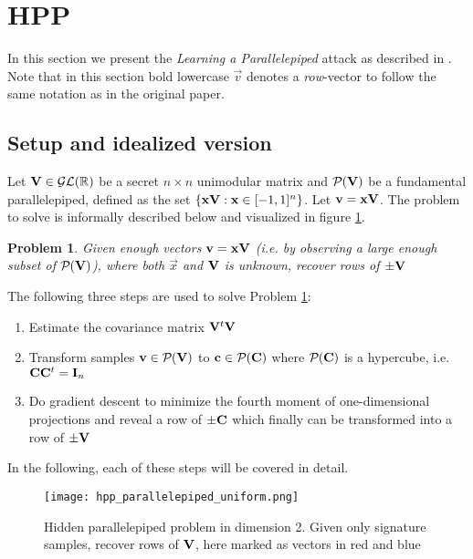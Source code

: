\newtheorem{lemma}{Lemma}
\newtheorem{proof}{Proof}
\newtheorem{hpp_problem_basic}{Problem}

\section{HPP}
In this section we present the \textit{Learning a Parallelepiped} attack as described in \cite{NR09}. 
Note that in this section bold lowercase $\vec{v}$ denotes a \textit{row}-vector to follow the same notation as in the original paper.
\subsection{Setup and idealized version}
Let $\mathbf{V} \in \mathcal{GL}(\mathbb{R})$ be a secret $n \times n$ unimodular matrix and $\mathcal{P}_{}(\mathbf{V})$ be a fundamental parallelepiped, defined as the set $\{\mathbf{x}\mathbf{V}: \mathbf{x} \in [-1, 1]^n\}$. 
Let $\mathbf{v} = \mathbf{x} \mathbf{V}$. 
The problem to solve is informally described below and visualized in figure \ref{hpp_parallelepiped_uniform}.

\begin{hpp_problem_basic}\label{Basic HPP problem}
    Given enough vectors $\mathbf{v} = \mathbf{x}\mathbf{V}$ (i.e. by observing a large enough subset of $\mathcal{P}_{}(\mathbf{V})$), where both $\vec{x}$ and $\mathbf{V}$ is unknown,
recover rows of $\pm \mathbf{V}$
\end{hpp_problem_basic}
The following three steps are used to solve Problem \ref{Basic HPP problem}:
\begin{enumerate}
    \item Estimate the covariance matrix $\mathbf{V}^t \mathbf{V}$
    \item Transform samples $\mathbf{v} \in \mathcal{P}_{}(\mathbf{V})$ to $\mathbf{c} \in \mathcal{P}_{}(\mathbf{C})$ where $\mathcal{P}_{}(\mathbf{C})$ is a hypercube, i.e. $\mathbf{C} \mathbf{C}^t = \mathbf{I}_n$
    \item Do gradient descent to minimize the fourth moment of one-dimensional projections and reveal a row of $\pm \mathbf{C}$ which finally can be transformed into a row of $\pm \mathbf{V}$
\end{enumerate}
In the following, each of these steps will be covered in detail.
\begin{figure}[H]
    \centering
    \texttt{[image: hpp\_parallelepiped\_uniform.png]}
    \caption{Hidden parallelepiped problem in dimension 2. Given only signature samples, recover rows of $\mathbf{V}$, here marked as vectors in red and blue}
  	\medskip 
    \label{hpp_parallelepiped_uniform}
\end{figure}
